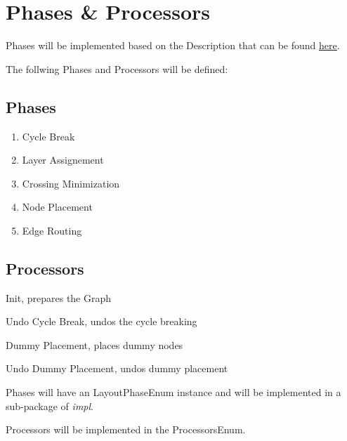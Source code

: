 \section{Phases \& Processors}

Phases will be implemented based on the Description that can be found \underline{
\href{https://www.eclipse.org/elk/documentation/algorithmdevelopers/algorithmimplementation/algorithmstructure.html}{here}}.

The follwing Phases and Processors will be defined:

\subsection{Phases}
\begin{enumerate}
\item Cycle Break
\item Layer Assignement
\item Crossing Minimization
\item Node Placement
\item Edge Routing
\end{enumerate}

\subsection{Processors}
\begin{list}{-}{}
\item Init, prepares the Graph
\item Undo Cycle Break, undos the cycle breaking
\item Dummy Placement, places dummy nodes
\item Undo Dummy Placement, undos dummy placement
\end{list}

Phases will have an LayoutPhaseEnum instance and will be implemented 
in a sub-package of \textit{impl}.

Processors will be implemented in the ProcessorsEnum.


